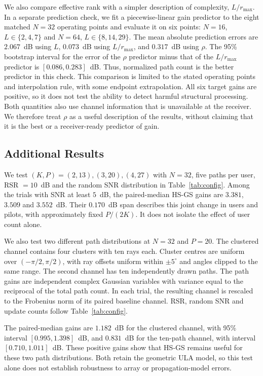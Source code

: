 \documentclass[journal]{IEEEtran}
\begin{document}
We also compare effective rank with a simpler description of complexity,
$L/r_{\max}$. In a separate prediction check, we fit a piecewise-linear
gain predictor to the eight matched $N=32$ operating points and evaluate
it on six points: $N=16$, $L\in\{2,4,7\}$ and $N=64$,
$L\in\{8,14,29\}$. The mean absolute prediction errors are
$2.067$~dB using $L$, $0.073$~dB using $L/r_{\max}$, and
$0.317$~dB using $\rho$. The 95\% bootstrap interval for the error of
the $\rho$ predictor minus that of the $L/r_{\max}$ predictor is
$[0.086,0.283]$~dB. Thus, normalized path count is the better predictor
in this check. This comparison is limited to the stated operating points
and interpolation rule, with some endpoint extrapolation. All six target
gains are positive, so it does not test the ability to detect harmful
structural processing. Both quantities also use channel information that
is unavailable at the receiver. We therefore treat $\rho$ as a useful
description of the results, without claiming that it is the best or a
receiver-ready predictor of gain.

\subsection{Additional Results}
\label{sec:kinv}

We test $(K,P)=(2,13),(3,20),(4,27)$ with $N=32$, five paths per user,
RSR $=10$~dB and the random SNR distribution in Table~\ref{tab:config}.
Among the trials with SNR at least $5$~dB, the paired-median HS-GS gains
are $3.381$, $3.509$ and $3.552$~dB. Their $0.170$~dB span describes
this joint change in users and pilots, with approximately fixed $P/(2K)$.
It does not isolate the effect of user count alone.

We also test two different path distributions at $N=32$ and $P=20$.
The clustered channel contains four clusters with ten rays each. Cluster
centres are uniform over $(-\pi/2,\pi/2)$, with ray offsets uniform within
$\pm5^\circ$ and angles clipped to the same range. The second channel has
ten independently drawn paths. The path gains are independent complex
Gaussian variables with variance equal to the reciprocal of the total
path count. In each trial, the resulting channel is rescaled to the
Frobenius norm of its paired baseline channel. RSR, random SNR and update
counts follow Table~\ref{tab:config}.

The paired-median gains are $1.182$~dB for the clustered channel, with
95\% interval $[0.995,1.398]$~dB, and $0.831$~dB for the ten-path
channel, with interval $[0.710,1.011]$~dB. These positive gains show that
HS-GS remains useful for these two path distributions. Both retain the
geometric ULA model, so this test alone does not establish robustness to
array or propagation-model errors.
\end{document}
